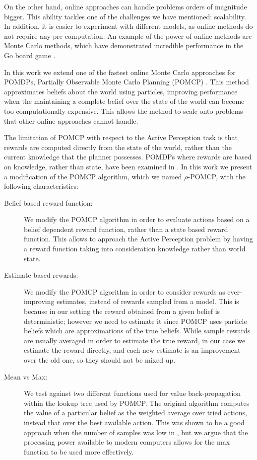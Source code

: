 On the other hand, online approaches can handle problems orders of magnitude bigger. This ability
tackles one of the challenges we have mentioned: scalability. In addition, it is easier to
experiment with different models, as online methods do not require any pre-computation. An example
of the power of online methods are Monte Carlo methods, which have demonstrated incredible
performance in the Go board game \cite{cit:mcts}.

In this work we extend one of the fastest online Monte Carlo approaches for POMDPs, Partially
Observable Monte Carlo Planning (POMCP) \cite{cit:pomcp}. This method approximates beliefs about the
world using particles, improving performance when the maintaining a complete belief over the state
of the world can become too computationally expensive. This allows the method to scale onto problems
that other online approaches cannot handle.

The limitation of POMCP with respect to the Active Perception task is that rewards are computed
directly from the state of the world, rather than the current knowledge that the planner possesses.
POMDPs where rewards are based on knowledge, rather than state, have been examined in
\cite{cit:rpomdp}. In this work we present a modification of the POMCP algorithm, which we named
$\rho$-POMCP, with the following characteristics:

\begin{description}
    \item[Belief based reward function:] We modify the POMCP algorithm in order to evaluate actions
        based on a belief dependent reward function, rather than a state based reward function. This
        allows to approach the Active Perception problem by having a reward function taking into
        consideration knowledge rather than world state.
    \item[Estimate based rewards:] We modify the POMCP algorithm in order to consider rewards as
        ever-improving estimates, instead of rewards sampled from a model. This is because in our
        setting the reward obtained from a given belief is deterministic; however we need to estimate
        it since POMCP uses particle beliefs which are approximations of the true beliefs. While
        sample rewards are usually averaged in order to estimate the true reward, in our case we
        estimate the reward directly, and each new estimate is an improvement over the old one, so they
        should not be mixed up.
    \item[Mean vs Max:] We test against two different functions used for value back-propagation within
        the lookup tree used by POMCP. The original algorithm computes the value of a particular
        belief as the weighted average over tried actions, instead that over the best available
        action. This was shown to be a good approach when the number of samples was low in
        \cite{cit:mcts}, but we argue that the processing power available to modern computers allows
        for the max function to be used more effectively.
\end{description}

